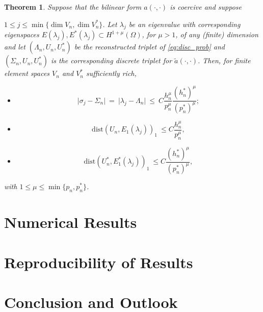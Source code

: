 \documentclass[preprint,12pt]{elsarticle}
\newtheorem{theorem}{Theorem}[section]
\begin{document}
\begin{theorem}
\label{th:adj_rec_2}
Suppose  that the bilinear form $a(\cdot,\cdot)$ is coercive and suppose

$ 1 \leq j\leq \min\{\dim V_n,\dim V_n^*\}$. 
Let
$\lambda_j$ be an eigenvalue with
corresponding eigenspaces $E(\lambda_j),E^*(\lambda_j)\subset H^{1+\mu}(\Omega)$, for $\mu>1$, of any (finite) dimension  and
let $(\Lambda_n,U_n,U_n^*)$ be the reconstructed triplet  of \eqref{eq:disc_prob} and $(\Sigma_n,U_n,U_n^*)$ is the corresponding discrete triplet for $\tilde a(\cdot,\cdot)$.
Then, for finite element spaces $V_n$ and $V_n^*$ sufficiently rich,


\begin{itemize}
\item[(i)] 
\begin{equation}\label{eq:supereig_rec_2}
\vert \sigma_j - \Sigma_n \vert \ = \ \vert \lambda_j - \Lambda_n \vert \ \leq \ C
\frac{h_n^{\mu} }{p_n^{\mu}}\frac{(h_n^*)^{\mu} }{(p_n^*)^{\mu}};  
\end{equation}
\item[(ii)] 
\begin{equation}
\label{eq:energy_rec_2} \mathrm{dist}(
U_n,E_1(\lambda_j))_{1} \ \leq
C \frac{h_n^{\mu}}{p_n^{\mu}}, 
\end{equation}
\item[(iii)]
\begin{equation}
\label{eq:energy_dual_rec_2} \mathrm{dist}(
U_n^*,E_1^*(\lambda_j))_{1} \ \leq
C \frac{(h_n^*)^{\mu}}{(p_n^*)^{\mu}}, 
\end{equation}
\end{itemize}
with $1\leq \mu\leq \min\{p_n,p_n^*\}$.
\end{theorem}



\section{Numerical Results} \label{sec:numer}



\section{Reproducibility of Results} \label{sec:reproducibility}



\section{Conclusion and Outlook}\label{sec:conclusion}
 
\end{document}
